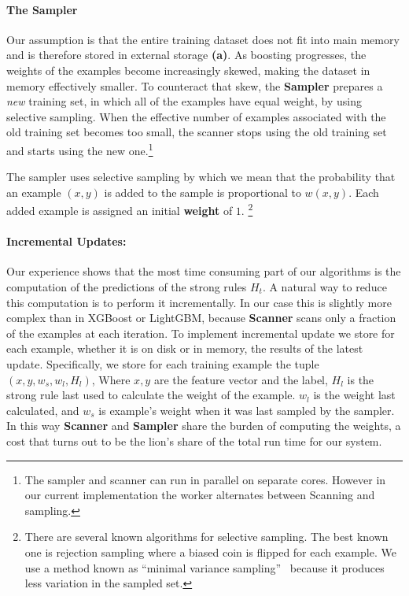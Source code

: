 \paragraph*{The Sampler} Our assumption is that the entire training dataset does
not fit into main memory and is therefore stored in external storage
{\bf (a)}. As boosting progresses, the weights of the examples become
increasingly skewed, making the dataset in memory effectively smaller.
To counteract that skew, the {\bf Sampler} prepares a {\em new}
training set, in which all of the examples have equal weight, by using
selective sampling. When the effective number of examples associated
with the old training set becomes too small, the scanner stops using
the old training set and starts using the new one.\footnote{The
  sampler and scanner can run in parallel on separate cores. However in
  our current implementation the worker alternates between Scanning and
  sampling.}

The sampler uses selective sampling by which we mean that the
probability that an example $(x,y)$ is added to the sample is
proportional to $w(x,y)$. Each added example is assigned an initial
{\bf weight} of $1$.
\footnote{There are several known algorithms
  for selective sampling. The best known one is rejection sampling
  where a biased coin is flipped for each example. We use a method
  known as ``minimal variance sampling''~\cite{kitagawa_monte_1996}
  because it produces less variation in the sampled set.}
\paragraph*{Incremental Updates:} Our experience shows that the most
time consuming part of our algorithms is the computation of the
predictions of the strong rules $H_t$. A natural way to reduce this
computation is to perform it incrementally. In our case this is
slightly more complex than in XGBoost or LightGBM, because {\bf
  Scanner} scans only a  fraction of the examples at each
iteration. To implement incremental update we store for each example,
whether it is on disk or in memory, the results of the latest
update. Specifically, we store for each training example the tuple
$(x, y, w_s, w_l,H_l)$, Where $x,y$ are the feature vector and the
label, $H_l$ is the strong rule last used to calculate the weight of
the example. $w_l$ is the weight last calculated, and $w_s$ is
example's weight when it was last sampled by the sampler. In this way
{\bf Scanner} and {\bf Sampler} share the burden of computing
the weights, a cost that turns out to be the lion's share of the total
run time for our system.

